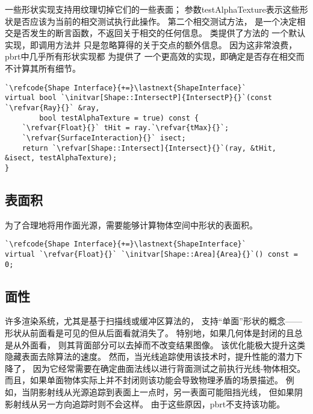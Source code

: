 一些形状实现支持用纹理切掉它们的一些表面；
参数{\ttfamily testAlphaTexture}表示这些形状是否应该为当前的相交测试执行此操作。
第二个相交测试方法，
是一个决定相交是否发生的断言函数，不返回关于相交的任何信息。
类提供了方法的
一个默认实现，即调用方法并
只是忽略算得的关于交点的额外信息。
因为这非常浪费，pbrt中几乎所有形状实现都
为提供了
一个更高效的实现，即确定是否存在相交而不计算其所有细节。
\begin{lstlisting}
`\refcode{Shape Interface}{+=}\lastnext{ShapeInterface}`
virtual bool `\initvar[Shape::IntersectP]{IntersectP}{}`(const `\refvar{Ray}{}` &ray,
        bool testAlphaTexture = true) const {
    `\refvar{Float}{}` tHit = ray.`\refvar{tMax}{}`;
    `\refvar{SurfaceInteraction}{}` isect;
    return `\refvar[Shape::Intersect]{Intersect}{}`(ray, &tHit, &isect, testAlphaTexture);
}
\end{lstlisting}

\subsection{表面积}\label{sub:表面积}
为了合理地将用作面光源，需要能够计算物体空间中形状的表面积。
\begin{lstlisting}
`\refcode{Shape Interface}{+=}\lastnext{ShapeInterface}`
virtual `\refvar{Float}{}` `\initvar[Shape::Area]{Area}{}`() const = 0;
\end{lstlisting}

\subsection{面性}\label{sub:面性}
许多渲染系统，尤其是基于扫描线或缓冲区算法的，
支持“单面”形状的概念——
形状从前面看是可见的但从后面看就消失了。
特别地，如果几何体是封闭的且总是从外面看，
则其背面部分可以去掉而不改变结果图像。
该优化能极大提升这类隐藏表面去除算法的速度。
然而，当光线追踪使用该技术时，提升性能的潜力下降了，
因为它经常需要在确定曲面法线以进行背面测试之前执行光线-物体相交。
而且，如果单面物体实际上并不封闭则该功能会导致物理矛盾的场景描述。
例如，当阴影射线从光源追踪到表面上一点时，另一表面可能阻挡光线，
但如果阴影射线从另一方向追踪时则不会这样。
由于这些原因，pbrt不支持该功能。